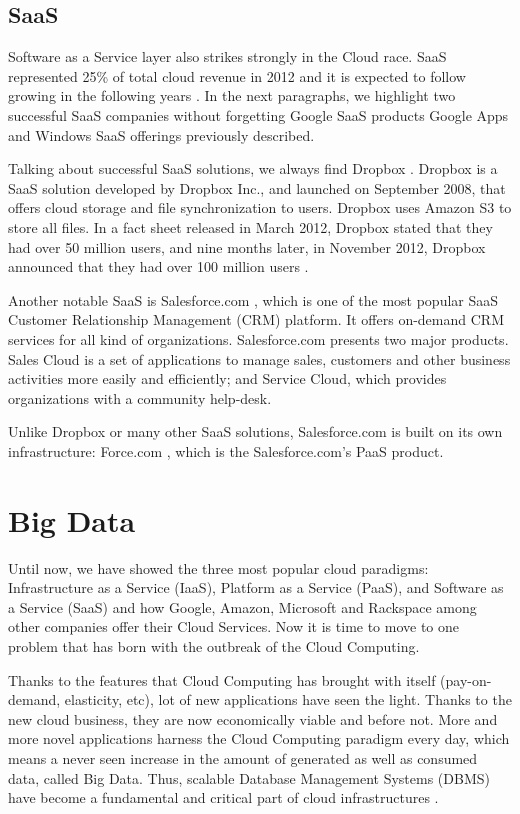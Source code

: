 \subsection{SaaS}
Software as a Service layer also strikes strongly in the Cloud race. SaaS represented 25\% of total cloud revenue in 2012 and it is expected to follow growing in the following years \cite{aslett2013451}. In the next paragraphs, we highlight two successful SaaS companies without forgetting Google SaaS products Google Apps and Windows SaaS offerings previously described.
\par
Talking about successful SaaS solutions, we always find Dropbox \cite{Dropbox}. Dropbox is a SaaS solution developed by Dropbox Inc., and launched on September 2008, that offers cloud storage and file synchronization to users. Dropbox uses Amazon S3 to store all files. 
In a fact sheet \cite{Dropbox:sheet} released in March 2012, Dropbox stated that they had over 50 million users, and nine months later, in November 2012, Dropbox announced that they had over 100 million users \cite{Dropbox:thanks}.
\par
Another notable SaaS is Salesforce.com \cite{Salesforce.com}, which is one of the most popular SaaS Customer Relationship Management (CRM) platform. It offers on-demand CRM services for all kind of organizations. Salesforce.com presents two major products. Sales Cloud is a set of applications to manage sales, customers and other business activities more easily and efficiently; and Service Cloud, which provides organizations with a community help-desk.
\par
Unlike Dropbox or many other SaaS solutions, Salesforce.com is built on its own infrastructure: Force.com \cite{Force.com}, which is the Salesforce.com's PaaS product.


\section{Big Data}


Until now, we have showed the three most popular cloud paradigms: Infrastructure as a Service (IaaS), Platform as a Service (PaaS), and Software as a Service (SaaS) and how Google, Amazon, Microsoft and Rackspace among other companies offer their Cloud Services. Now it is time to move to one problem that has born with the outbreak of the Cloud Computing.
\par
Thanks to the features that Cloud Computing has brought with itself (pay-on-demand, elasticity, etc), lot of new applications have seen the light. Thanks to the new cloud business, they are now economically viable and before not. More and more novel applications harness the Cloud Computing paradigm every day, which means a never seen increase in the amount of generated as well as consumed data, called Big Data. Thus, scalable Database Management Systems (DBMS) have become a fundamental and critical part of cloud infrastructures \cite{agrawal2010big}.

